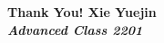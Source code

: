 \documentclass[UTF8]{ctexbeamer}
\begin{document}
\begin{frame}
	\begin{center}
		\vfill
		\LARGE\bfseries Thank You!
		\vfill
		\normalsize
		Xie Yuejin \\
		\textit{Advanced Class 2201} \\
		\date{}
	\end{center}
\end{frame}
\end{document}
